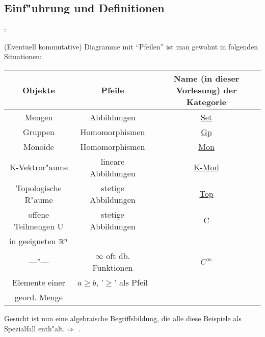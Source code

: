 \def\Ob#1{\operatorname{Ob}_{\mathcal{#1}}}
\def\Mor(#1;#2;#3){\operatorname{Mor}_{\mathcal{#1}}(#2,#3)}
\subsection{Einf"uhrung und Definitionen}
\motivation{}:{(Eventuell kommutative) Diagramme mit ``Pfeilen'' ist
  man gewohnt in folgenden Situationen:\\
  \begin{tabular}{c|c|c}
  Objekte  & Pfeile & Name (in dieser Vorlesung) der Kategorie \\
  \hline
  Mengen  & Abbildungen  & \underline{Set} \\
  Gruppen & Homomorphismen & \underline{Gp} \\
  Monoide & Homomorphismen & \underline{Mon} \\
  K-Vektror"aume & lineare Abbildungen & \underline{K-Mod} \\
  Topologische R"aume & stetige Abbildungen & \underline{Top} \\
  offene Teilmengen U  & stetige Abbildungen & C \\
  in geeigneten $\mathbb R^n$ & & \\
  ---''--- & $\infty$ oft db. Funktionen & $C^{\infty}$ \\
  Elemente einer  & $a\geq b$, '$\geq$' als Pfeil & \\
  geord. Menge & & \\  
  \end{tabular}	
 Gesucht ist nun eine algebraische Begriffsbildung, die alle diese
 Beispiele als Spezialfall enth"alt.$\Rightarrow$ {\emph {}}.		
			}
